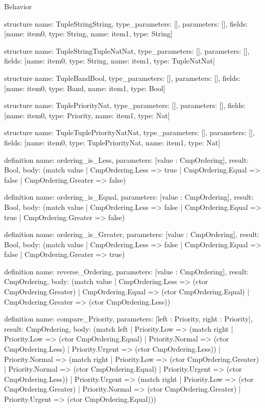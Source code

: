 \begin{lexlean}{Behavior}
\begin{semanticmodule}
structure{
  name: TupleStringString,
  type_parameters: [],
  parameters: [],
  fields: [{name: item0, type: String}, {name: item1, type: String}]
}

structure{
  name: TupleStringTupleNatNat,
  type_parameters: [],
  parameters: [],
  fields: [{name: item0, type: String}, {name: item1, type: TupleNatNat}]
}

structure{
  name: TupleBandBool,
  type_parameters: [],
  parameters: [],
  fields: [{name: item0, type: Band}, {name: item1, type: Bool}]
}

structure{
  name: TuplePriorityNat,
  type_parameters: [],
  parameters: [],
  fields: [{name: item0, type: Priority}, {name: item1, type: Nat}]
}

structure{
  name: TupleTuplePriorityNatNat,
  type_parameters: [],
  parameters: [],
  fields: [{name: item0, type: TuplePriorityNat}, {name: item1, type: Nat}]
}

definition{
  name: ordering_is_Less,
  parameters: [value : CmpOrdering],
  result: Bool,
  body: (match value
    | CmpOrdering.Less => true
    | CmpOrdering.Equal => false
    | CmpOrdering.Greater => false)
}

definition{
  name: ordering_is_Equal,
  parameters: [value : CmpOrdering],
  result: Bool,
  body: (match value
    | CmpOrdering.Less => false
    | CmpOrdering.Equal => true
    | CmpOrdering.Greater => false)
}

definition{
  name: ordering_is_Greater,
  parameters: [value : CmpOrdering],
  result: Bool,
  body: (match value
    | CmpOrdering.Less => false
    | CmpOrdering.Equal => false
    | CmpOrdering.Greater => true)
}

definition{
  name: reverse_Ordering,
  parameters: [value : CmpOrdering],
  result: CmpOrdering,
  body: (match value
    | CmpOrdering.Less => (ctor CmpOrdering.Greater)
    | CmpOrdering.Equal => (ctor CmpOrdering.Equal)
    | CmpOrdering.Greater => (ctor CmpOrdering.Less))
}

definition{
  name: compare_Priority,
  parameters: [left : Priority, right : Priority],
  result: CmpOrdering,
  body: (match left
    | Priority.Low => (match right
      | Priority.Low => (ctor CmpOrdering.Equal)
      | Priority.Normal => (ctor CmpOrdering.Less)
      | Priority.Urgent => (ctor CmpOrdering.Less))
    | Priority.Normal => (match right
      | Priority.Low => (ctor CmpOrdering.Greater)
      | Priority.Normal => (ctor CmpOrdering.Equal)
      | Priority.Urgent => (ctor CmpOrdering.Less))
    | Priority.Urgent => (match right
      | Priority.Low => (ctor CmpOrdering.Greater)
      | Priority.Normal => (ctor CmpOrdering.Greater)
      | Priority.Urgent => (ctor CmpOrdering.Equal)))
}


\end{semanticmodule}
\end{lexlean}
